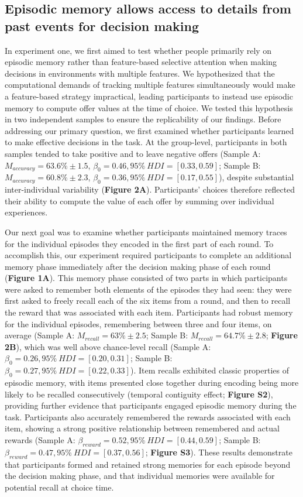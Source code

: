 \documentclass[10pt,letterpaper]{article}
\begin{document}
\subsection{Episodic memory allows access to details from past events for decision making}

In experiment one, we first aimed to test whether people primarily rely on episodic memory rather than feature-based selective attention when making decisions in environments with multiple features. We hypothesized that the computational demands of tracking multiple features simultaneously would make a feature-based strategy impractical, leading participants to instead use episodic memory to compute offer values at the time of choice. We tested this hypothesis in two independent samples to ensure the replicability of our findings. Before addressing our primary question, we first examined whether participants learned to make effective decisions in the task. At the group-level, participants in both samples tended to take positive and to leave negative offers (Sample A: $M_{accuracy} = 63.6\% \pm 1.5$, $\beta_{0} = 0.46, 95\% \ HDI = [0.33, 0.59]$; Sample B: $M_{accuracy} = 60.8\% \pm 2.3$, $\beta_{0} = 0.36, 95\% \ HDI = [0.17, 0.55]$), despite substantial inter-individual variability (\textbf{Figure 2A}). Participants' choices therefore reflected their ability to compute the value of each offer by summing over individual experiences.

Our next goal was to examine whether participants maintained memory traces for the individual episodes they encoded in the first part of each round. To accomplish this, our experiment required participants to complete an additional memory phase immediately after the decision making phase of each round (\textbf{Figure 1A}). This memory phase consisted of two parts in which participants were asked to remember both elements of the episodes they had seen: they were first asked to freely recall each of the six items from a round, and then to recall the reward that was associated with each item. Participants had robust memory for the individual episodes, remembering between three and four items, on average (Sample A: $M_{recall} = 63\% \pm 2.5$; Sample B: $M_{recall} = 64.7\% \pm 2.8$; \textbf{Figure 2B}), which was well above chance-level recall (Sample A: $\beta_{0} = 0.26, 95\% \ HDI = [0.20, 0.31]$; Sample B: $\beta_{0} = 0.27, 95\% \ HDI = [0.22, 0.33]$). Item recalls exhibited classic properties of episodic memory, with items presented close together during encoding being more likely to be recalled consecutively (temporal contiguity effect\cite{kahanaFoundationsHumanMemory2012}; \textbf{Figure S2}), providing further evidence that participants engaged episodic memory during the task. Participants also accurately remembered the rewards associated with each item, showing a strong positive relationship between remembered and actual rewards (Sample A: $\beta_{reward} = 0.52, 95\% \ HDI = [0.44, 0.59]$; Sample B: $\beta_{reward} = 0.47, 95\% \ HDI = [0.37, 0.56]$; \textbf{Figure S3}). These results demonstrate that participants formed and retained strong memories for each episode beyond the decision making phase, and that individual memories were available for potential recall at choice time.
\end{document}
